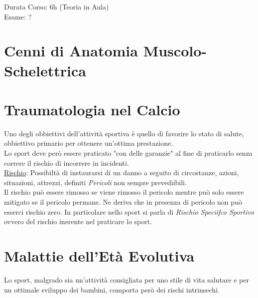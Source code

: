 \documentclass[../uefaC.tex]{subfiles}
\begin{document}

Durata Corso: 6h (Teoria in Aula) \hfill \\
Esame: ?

\section{Cenni di Anatomia Muscolo-Schelettrica}

\section{Traumatologia nel Calcio}

Uno degli obbiettivi dell'attività sportiva è quello di favorire lo stato di salute, obbiettivo primario per ottenere un'ottima prestazione. \hfill \\
Lo sport deve però essere praticato "con delle garanzie" al fine di praticarlo senza correre il rischio di incorrere in incidenti. \hfill \\
\underline{Rischio}: Possibiltà di instaurarsi di un danno a seguito di circostanze, azioni, situazioni, attrezzi, definiti \emph{Pericoli} non sempre prevediibili. \hfill \\
Il rischio può essere rimosso se viene rimosso il pericolo mentre può solo essere mitigato se il pericolo permane. Ne deriva che in presenza di pericolo non può esserci rischio zero. In particolare nello sport si parla di \emph{Rischio Speciifco Sportivo} ovvero del rischio inerente nel praticare lo sport.


\section{Malattie dell'Età Evolutiva}

Lo sport, malgrado sia un'attività consigliata per uno stile di vita salutare e per un ottimale sviluppo dei bambini, comporta però dei rischi intrinsechi.
\end{document}
